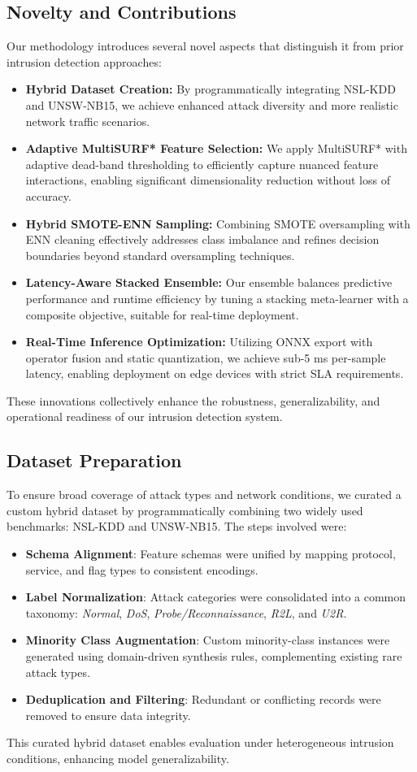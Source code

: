 \documentclass[conference]{IEEEtran}
\begin{document}
\subsection{Novelty and Contributions}
Our methodology introduces several novel aspects that distinguish it from prior intrusion detection approaches:
\begin{itemize}
    \item \textbf{Hybrid Dataset Creation:} By programmatically integrating NSL-KDD and UNSW-NB15, we achieve enhanced attack diversity and more realistic network traffic scenarios.
    \item \textbf{Adaptive MultiSURF* Feature Selection:} We apply MultiSURF* with adaptive dead-band thresholding to efficiently capture nuanced feature interactions, enabling significant dimensionality reduction without loss of accuracy.
    \item \textbf{Hybrid SMOTE-ENN Sampling:} Combining SMOTE oversampling with ENN cleaning effectively addresses class imbalance and refines decision boundaries beyond standard oversampling techniques.
    \item \textbf{Latency-Aware Stacked Ensemble:} Our ensemble balances predictive performance and runtime efficiency by tuning a stacking meta-learner with a composite objective, suitable for real-time deployment.
    \item \textbf{Real-Time Inference Optimization:} Utilizing ONNX export with operator fusion and static quantization, we achieve sub-5 ms per-sample latency, enabling deployment on edge devices with strict SLA requirements.
\end{itemize}
These innovations collectively enhance the robustness, generalizability, and operational readiness of our intrusion detection system.

\subsection{Dataset Preparation}
To ensure broad coverage of attack types and network conditions, we curated a custom hybrid dataset by programmatically combining two widely used benchmarks: NSL-KDD and UNSW-NB15. The steps involved were:
\begin{itemize}
    \item \textbf{Schema Alignment}: Feature schemas were unified by mapping protocol, service, and flag types to consistent encodings.
    \item \textbf{Label Normalization}: Attack categories were consolidated into a common taxonomy: \textit{Normal}, \textit{DoS}, \textit{Probe/Reconnaissance}, \textit{R2L}, and \textit{U2R}.
    \item \textbf{Minority Class Augmentation}: Custom minority-class instances were generated using domain-driven synthesis rules, complementing existing rare attack types.
    \item \textbf{Deduplication and Filtering}: Redundant or conflicting records were removed to ensure data integrity.
\end{itemize}
This curated hybrid dataset enables evaluation under heterogeneous intrusion conditions, enhancing model generalizability.
\end{document}
